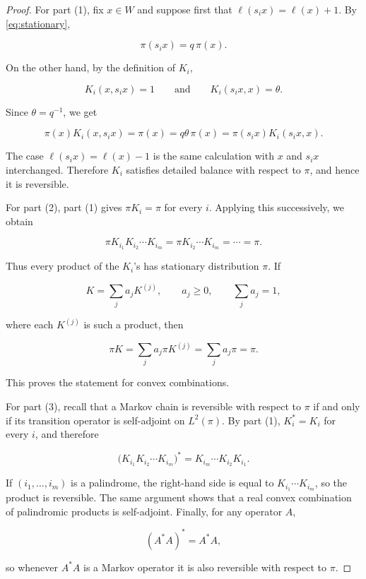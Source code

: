 \documentclass[11pt]{article}
\theoremstyle{plain}  %
\begin{document}
\begin{proof}
For part (1), fix $x\in W$ and suppose first that
$\ell(s_i x)=\ell(x)+1$. By \eqref{eq:stationary},

$$
    \pi(s_i x)=q\,\pi(x).
$$

On the other hand, by the definition of $K_i$,

$$
    K_i(x,s_i x)=1
    \qquad\text{and}\qquad
    K_i(s_i x,x)=\theta.
$$

Since $\theta=q^{-1}$, we get

$$
    \pi(x)K_i(x,s_i x)
    =\pi(x)
    =q\theta\,\pi(x)
    =\pi(s_i x)K_i(s_i x,x).
$$

The case $\ell(s_i x)=\ell(x)-1$ is the same calculation with $x$ and
$s_i x$ interchanged. Therefore $K_i$ satisfies detailed balance with
respect to $\pi$, and hence it is reversible.

For part (2), part (1) gives $\pi K_i=\pi$ for every $i$. Applying this
successively, we obtain

$$
    \pi K_{i_1}K_{i_2}\cdots K_{i_m}
    =
    \pi K_{i_2}\cdots K_{i_m}
    =\cdots=\pi.
$$

Thus every product of the $K_i$'s has stationary distribution $\pi$.
If

$$
    K=\sum_j a_j K^{(j)},
    \qquad a_j\geq0,\qquad \sum_j a_j=1,
$$

where each $K^{(j)}$ is such a product, then

$$
    \pi K
    =
    \sum_j a_j\pi K^{(j)}
    =
    \sum_j a_j\pi
    =
    \pi.
$$

This proves the statement for convex combinations.

For part (3), recall that a Markov chain is reversible with respect to
$\pi$ if and only if its transition operator is self-adjoint on
$L^2(\pi)$. By part (1), $K_i^*=K_i$ for every $i$, and therefore

$$
    \bigl(K_{i_1}K_{i_2}\cdots K_{i_m}\bigr)^*
    =
    K_{i_m}\cdots K_{i_2}K_{i_1}.
$$

If $(i_1,\ldots,i_m)$ is a palindrome, the right-hand side is equal to
$K_{i_1}\cdots K_{i_m}$, so the product is reversible. The same argument
shows that a real convex combination of palindromic products is
self-adjoint. Finally, for any operator $A$,

$$
    (A^*A)^*=A^*A,
$$

so whenever $A^*A$ is a Markov operator it is also reversible with
respect to $\pi$.
\end{proof}
\end{document}
